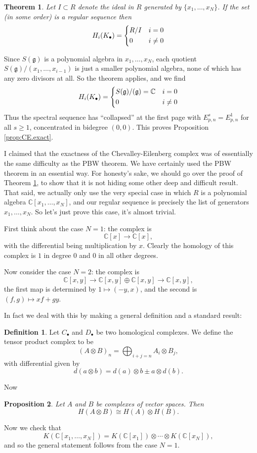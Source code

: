 \documentclass[12pt]{article}
\theoremstyle{plain}
\newtheorem{thm}{Theorem}[section]
\newtheorem{prop}[thm]{Proposition}
\theoremstyle{definition}
\newtheorem{defn}{Definition}[section]
\numberwithin{equation}{section}
\newcommand{\C}{\mathbb{C}}
\newcommand{\g}{\mathfrak{g}}
\begin{document}
\begin{thm}\label{thm:Koszul.res}
Let $I \subset R$ denote the ideal in $R$ generated by $\{x_1, \ldots, x_N\}$. If the set (in some order) is a regular sequence then
\begin{align*}
H_i(K_\bullet) = \begin{dcases}
R / I & i=0 \\
0 & i \neq 0
\end{dcases}
\end{align*}
\end{thm}
Since $S(\g)$ is a polynomial algebra in $x_1, \ldots, x_N$, each quotient $S(\g) / (x_1, \ldots, x_{i-1})$ is just a smaller polynomial algebra, none of which has any zero divisors at all. So the theorem applies, and we find
\begin{align*}
H_i(K_\bullet) = \begin{dcases}
S(\g) / (\g) = \C & i=0 \\
0 & i \neq 0
\end{dcases}
\end{align*}
Thus the spectral sequence has ``collapsed'' at the first page with $E^s_{p, n} = E^1_{p, n}$ for all $s \geq 1$, concentrated in bidegree $(0, 0)$. This proves Proposition \ref{prop:CE.exact}.

I claimed that the exactness of the Chevalley-Eilenberg complex was of essentially the same difficulty as the PBW theorem. We have certainly used the PBW theorem in an essential way. For honesty's sake, we should go over the proof of Theorem \ref{thm:Koszul.res}, to show that it is not hiding some other deep and difficult result. That said, we actually only use the very special case in which $R$ is a polynomial algebra $\C[x_1, \ldots, x_N]$, and our regular sequence is precisely the list of generators $x_1, \ldots, x_N$. So let's just prove this case, it's almost trivial.

First think about the case $N=1$: the complex is
\[
\C[x] \rightarrow \C[x],
\]
with the differential being multiplication by $x$. Clearly the homology of this complex is $1$ in degree $0$ and $0$ in all other degrees.

Now consider the case $N =2$: the complex is
\[
\C[x, y] \rightarrow \C[x, y] \oplus \C[x, y] \rightarrow \C[x, y],
\]
the first map is determined by $1 \mapsto (-y, x)$, and the second is $(f, g) \mapsto xf+gy$.

In fact we deal with this by making a general definition and a standard result:
\begin{defn}
Let $C_\bullet$ and $D_\bullet$ be two homological complexes. We define the tensor product complex to be
\[
(A \otimes B)_n = \bigoplus_{i+j = n} A_i \otimes B_j,
\]
with differential given by
\[
d(a \otimes b) = d(a) \otimes b \pm a \otimes d(b).
\]
\end{defn}
Now
\begin{prop}
Let $A$ and $B$ be complexes of vector spaces. Then
\[
H(A \otimes B) \cong H(A) \otimes H(B).
\]
\end{prop}
Now we check that
\[
K(\C[x_1, \ldots, x_N]) = K(\C[x_1]) \otimes \cdots \otimes K(\C[x_N]),
\]
and so the general statement follows from the case $N=1$.
\end{document}
